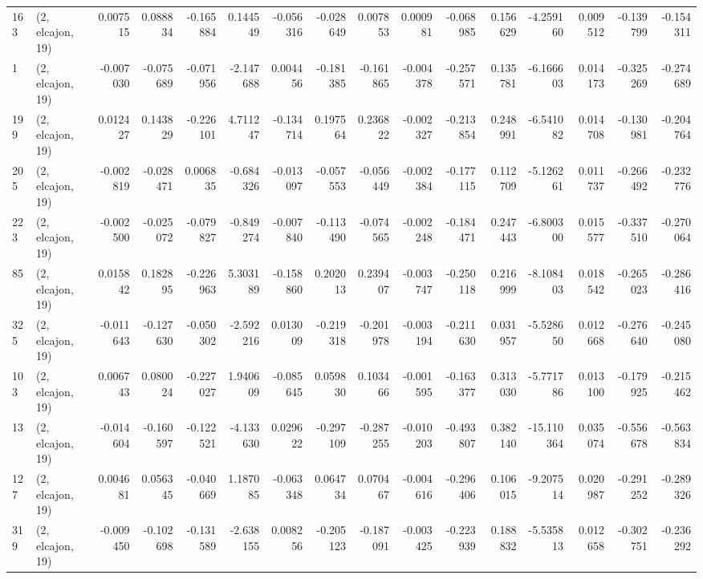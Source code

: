 \begin{tabular}{llrrrrrrrrrrrrrr}
163 &  (2, elcajon, 19) &   0.007515 &  0.088834 & -0.165884 &     0.144549 &  -0.056316 &  -0.028649 &   0.007853 &  0.000981 & -0.068985 &  0.156629 &   -4.259160 &  0.009512 & -0.139799 & -0.154311 \\
1   &  (2, elcajon, 19) &  -0.007030 & -0.075689 & -0.071956 &    -2.147688 &   0.004456 &  -0.181385 &  -0.161865 & -0.004378 & -0.257571 &  0.135781 &   -6.166603 &  0.014173 & -0.325269 & -0.274689 \\
199 &  (2, elcajon, 19) &   0.012427 &  0.143829 & -0.226101 &     4.711247 &  -0.134714 &   0.197564 &   0.236822 & -0.002327 & -0.213854 &  0.248991 &   -6.541082 &  0.014708 & -0.130981 & -0.204764 \\
205 &  (2, elcajon, 19) &  -0.002819 & -0.028471 &  0.006835 &    -0.684326 &  -0.013097 &  -0.057553 &  -0.056449 & -0.002384 & -0.177115 &  0.112709 &   -5.126261 &  0.011737 & -0.266492 & -0.232776 \\
223 &  (2, elcajon, 19) &  -0.002500 & -0.025072 & -0.079827 &    -0.849274 &  -0.007840 &  -0.113490 &  -0.074565 & -0.002248 & -0.184471 &  0.247443 &   -6.800300 &  0.015577 & -0.337510 & -0.270064 \\
85  &  (2, elcajon, 19) &   0.015842 &  0.182895 & -0.226963 &     5.303189 &  -0.158860 &   0.202013 &   0.239407 & -0.003747 & -0.250118 &  0.216999 &   -8.108403 &  0.018542 & -0.265023 & -0.286416 \\
325 &  (2, elcajon, 19) &  -0.011643 & -0.127630 & -0.050302 &    -2.592216 &   0.013009 &  -0.219318 &  -0.201978 & -0.003194 & -0.211630 &  0.031957 &   -5.528650 &  0.012668 & -0.276640 & -0.245080 \\
103 &  (2, elcajon, 19) &   0.006743 &  0.080024 & -0.227027 &     1.940609 &  -0.085645 &   0.059830 &   0.103466 & -0.001595 & -0.163377 &  0.313030 &   -5.771786 &  0.013100 & -0.179925 & -0.215462 \\
13  &  (2, elcajon, 19) &  -0.014604 & -0.160597 & -0.122521 &    -4.133630 &   0.029622 &  -0.297109 &  -0.287255 & -0.010203 & -0.493807 &  0.382140 &  -15.110364 &  0.035074 & -0.556678 & -0.563834 \\
127 &  (2, elcajon, 19) &   0.004681 &  0.056345 & -0.040669 &     1.187085 &  -0.063348 &   0.064734 &   0.070467 & -0.004616 & -0.296406 &  0.106015 &   -9.207514 &  0.020987 & -0.291252 & -0.289326 \\
319 &  (2, elcajon, 19) &  -0.009450 & -0.102698 & -0.131589 &    -2.638155 &   0.008256 &  -0.205123 &  -0.187091 & -0.003425 & -0.223939 &  0.188832 &   -5.535813 &  0.012658 & -0.302751 & -0.236292 \\

\end{tabular}
